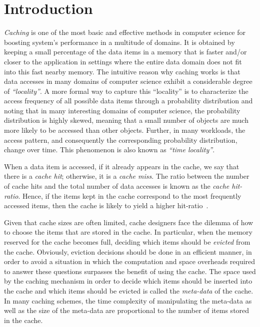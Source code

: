 \documentclass[10pt,a4paper]{article}
\begin{document}
\newpage

\section{Introduction}

\emph{Caching} is one of the most basic and effective methods in computer science for boosting system's performance in a multitude of domains.
It is obtained by keeping a small percentage of the data items in a memory that is faster and/or closer to the application in settings where the
entire data domain
does not fit into this fast nearby memory.
The intuitive reason why caching works is that data accesses in many domains of computer science exhibit a considerable degree of \emph{``locality''}.
A more formal way to capture this ``locality'' is to characterize the access frequency of all possible data items through a probability distribution and noting
that in many interesting domains of computer science,
the probability distribution is highly skewed, meaning that a small number of objects are
much more likely to be accessed than other objects.
Further, in many workloads, the access pattern, and consequently the corresponding probability distribution, change over time.
This phenomenon is also known as \emph{``time locality''}.

When a data item is accessed, if it already appears in the cache, we say that there is a \emph{cache hit}; otherwise, it is a \emph{cache miss}.
The ratio between the number of cache hits and the total number of data accesses is known as the \emph{cache hit-ratio}.
Hence, if the items kept in the cache correspond to the most frequently accessed items, then the cache is likely to yield a higher hit-ratio~\cite{LRU}.


Given that cache sizes are often limited, cache designers face the dilemma of how to choose the items that are stored in the cache.
In particular, when the memory reserved for the cache becomes full, deciding which items should be \emph{evicted} from the cache.
Obviously, eviction decisions should be done in an efficient manner, in order to avoid a situation in which the computation and space overheads required to
answer these questions surpasses the benefit of using the cache. The space used by the caching mechanism in order to decide which
items should be inserted into the cache and which items should be evicted is called the \emph{meta-data} of the cache. In many caching schemes,
the time complexity of manipulating the meta-data as well as the size of the meta-data are proportional to the number of items stored in the cache.
\end{document}

